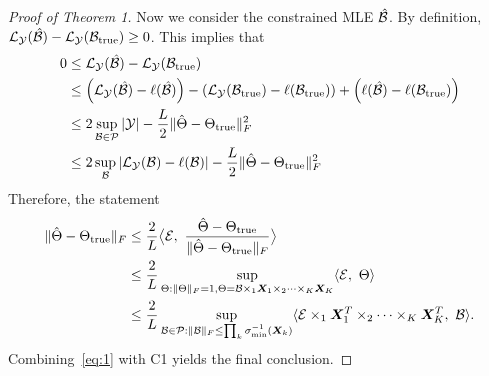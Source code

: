 \documentclass[11pt]{article}
\theoremstyle{plain}
\theoremstyle{definition}
\begin{document}
\begin{proof}[Proof of Theorem 1]
Now we consider the constrained MLE $\hat {\mathcal{B}}$. By definition, $\mathcal{L}_{\mathcal{Y}}(\hat {\mathcal{B}})- \mathcal{L}_{\mathcal{Y}}(\mathcal{B}_{\text{true}})\geq 0$. This implies that
\begin{align}
0&\leq \mathcal{L}_{\mathcal{Y}}(\hat {\mathcal{B}})- \mathcal{L}_{\mathcal{Y}}(\mathcal{B}_{\text{true}}) \\
&\leq \left(\mathcal{L}_{\mathcal{Y}}(\hat {\mathcal{B}})-\ell(\hat {\mathcal{B}})\right)-\left( \mathcal{L}_{\mathcal{Y}}(\mathcal{B}_{\text{true}})-\ell(\mathcal{B}_{\text{true}})\right)+\left(\ell(\hat {\mathcal{B}})-\ell(\mathcal{B}_{\text{true}})\right)\\
&\leq 2\sup_{\mathcal{B}\in\mathcal{P}}|\mathcal{Y}| -{L\over 2}\lVert\hat \Theta-\Theta_{\text{true}}\rVert_F^2\\
&\leq 2\sup_{\mathcal{B}}|\mathcal{L}_{\mathcal{Y}}(\mathcal{B})-\ell(\mathcal{B})|-{L\over 2}\lVert\hat \Theta-\Theta_{\text{true}}\rVert_F^2
\end{align}
Therefore, the statement
\begin{align}\label{eq:1}
\FnormSize{}{\hat \Theta-\trueT}&\leq {2\over L}\big\langle \tE,\ {\hat \Theta -\trueT \over \FnormSize{}{\hat \Theta-\trueT}} \big\rangle\\
&\leq {2\over L}\sup_{\Theta: \FnormSize{}{\Theta}=1, \Theta=\tB\times_1\mX_1\times_2\cdots\times_K \mX_K}\langle \tE,\ \Theta \rangle\\
&\leq {2\over L}\sup_{\tB\in\tP: \FnormSize{}{\tB}\leq \prod_k \sigma^{-1}_{\min}(\mX_k)} \langle \tE\times_1\mX^T_1\times_2\cdots\times_K \mX^T_K,\ \tB\rangle.
\end{align}
Combining~\eqref{eq:1} with C1 yields the final conclusion. 

\end{proof}
\end{document}
